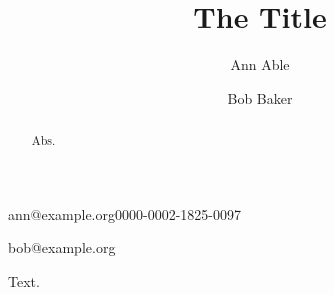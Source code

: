 \documentclass[english]{lni}
\begin{document}
\title{The Title}
\author[1]{Ann Able}{ann@example.org}{0000-0002-1825-0097}
\author[2]{Bob Baker}{bob@example.org}{}
\maketitle
\begin{abstract}
Abs.
\end{abstract}
Text.
\end{document}
